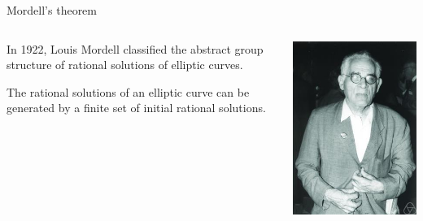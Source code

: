 \documentclass[10pt]{beamer}
\theoremstyle{definition}
\begin{document}
\begin{frame}[t]{Mordell's theorem}

\begin{columns}[T]

\begin{column}{0.8\textwidth}
In 1922, Louis Mordell classified the abstract group structure of rational solutions of elliptic curves.

\vspace{0.5cm}

\begin{theorem}[Mordell]
The rational solutions of an elliptic curve can be generated by a finite set of initial rational solutions.
\end{theorem}
\end{column}

\begin{column}{0.1\textwidth}
\hspace{-1cm}
\includegraphics[width=1.5\textwidth]{mordell.jpg}
\end{column}


\end{columns}
\end{frame}
\end{document}
